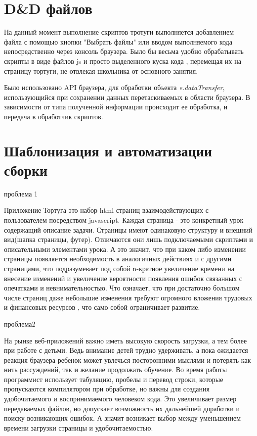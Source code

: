 \chapter{D\&D файлов} \label{chapt1}
На данный момент выполнение скриптов тротуги выполняется добавлением файла с помощью кнопки "Выбрать файлы" или вводом выполняемого кода непосредственно через консоль браузера.  Было бы весьма удобно обрабатывать скрипты в виде файлов js и просто выделенного куска кода , перемещая их  на страницу тортуги, не отвлекая школьника от основного занятия.

Было использовано API браузера, для обработки объекта \textit{e.dataTransfer}, использующийся при сохранении данных перетаскиваемых в области браузера.
В зависимости от типа полученной информации  происходит ее обработка, и передача в обработчик скриптов.


\chapter{Шаблонизация и автоматизации сборки} \label{chapt1}

проблема 1

Приложение Тортуга это набор html страниц взаимодействующих с пользователем посредством javascript. Каждая страница - это конкретный урок содержащий  описание задачи. Страницы имеют одинаковую структуру и внешний вид(шапка страницы, футер). Отличаются они лишь подключаемыми скриптами и описательными элементами урока. А это значит, что при каком либо изменении страницы появляется необходимость в аналогичных действиях и с другими страницами, что подразумевает под собой n-кратное увеличение времени на внесение изменений и увеличение вероятности появления ошибок связанных с опечатками и невнимательностью. Что означает, что  при достаточно большом числе страниц  даже небольшие изменения требуют огромного вложения трудовых и финансовых ресурсов , что само собой ограничивает развитие.


проблема2

На рынке веб-приложений важно иметь высокую скорость загрузки, а тем более при работе с детьми. Ведь внимание детей трудно удерживать, а пока ожидается реакция браузера ребенок может увлечься посторонними мыслями и потерять как нить рассуждений, так и желание продолжать обучение. 
Во время работы программист использует табуляцию, пробелы и перевод строки, которые пропускаются компилятором при обработке, но важны для создания удобочитаемого и воспринимаемого человеком кода. Это увеличивает размер передаваемых файлов, но допускает возможность их дальнейшей доработки и поиску возникающих ошибок. А значит возникает выбор между уменьшением времени загрузки страницы и удобочитаемостью.

